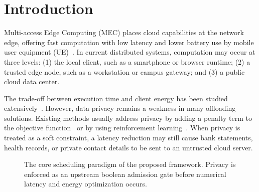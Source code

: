 \documentclass[conference]{IEEEtran}
\begin{document}
\section{Introduction}

Multi-access Edge Computing (MEC) places cloud capabilities at the network edge, offering fast computation with low latency and lower battery use by mobile user equipment (UE)~\cite{etsi_mec,shi2016}.
In current distributed systems, computation may occur at three levels:
(1) the local client, such as a smartphone or browser runtime;
(2) a trusted edge node, such as a workstation or campus gateway; and
(3) a public cloud data center.

The trade-off between execution time and client energy has been studied extensively~\cite{zhang2018,mao2017,you2017,mach2017}.
However, data privacy remains a weakness in many offloading solutions.
Existing methods usually address privacy by adding a penalty term to the objective function~\cite{zhu2021} or by using reinforcement learning~\cite{gao2024}.
When privacy is treated as a soft constraint, a latency reduction may still cause bank statements, health records, or private contact details to be sent to an untrusted cloud server.

\begin{figure}[t]
\centering
{}
\caption{The core scheduling paradigm of the proposed framework. Privacy is enforced as an upstream boolean admission gate before numerical latency and energy optimization occurs.}
\label{fig:paradigm}
\end{figure}
\end{document}
